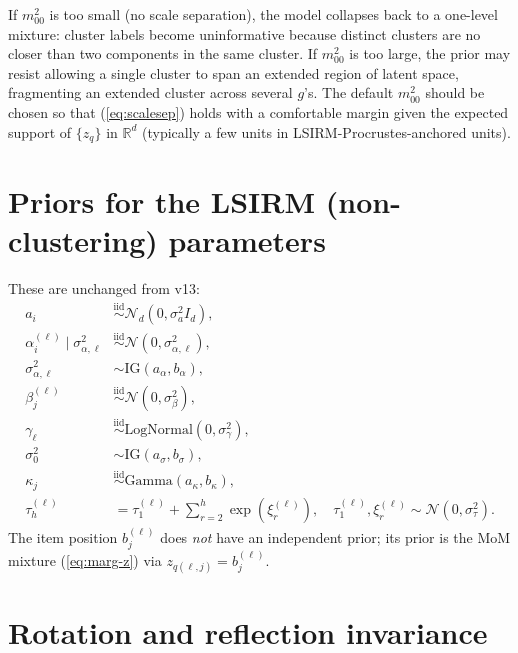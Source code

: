 \documentclass[11pt]{article}
\newcommand{\R}{\mathbb{R}}
\newcommand{\IG}{\mathrm{IG}}
\begin{document}
If $m_{00}^2$ is too small (no scale separation), the model collapses
back to a one-level mixture: cluster labels become uninformative because
distinct clusters are no closer than two components in the same cluster.
If $m_{00}^2$ is too large, the prior may resist allowing a single cluster
to span an extended region of latent space, fragmenting an extended
cluster across several $g$'s. The default $m_{00}^2$ should be chosen so
that (\ref{eq:scalesep}) holds with a comfortable margin given the
expected support of $\{z_q\}$ in $\R^d$ (typically a few units in
LSIRM-Procrustes-anchored units).

\section{Priors for the LSIRM (non-clustering) parameters}
\label{sec:other-priors}

These are unchanged from v13:
\begin{align}
a_i              &\stackrel{\mathrm{iid}}{\sim} \mathcal{N}_d(0,\sigma_a^2 I_d), \label{eq:a-prior}\\
\alpha_i^{(\ell)}\mid \sigma_{\alpha,\ell}^2
                 &\stackrel{\mathrm{iid}}{\sim} \mathcal{N}(0,\sigma_{\alpha,\ell}^2),\label{eq:alpha-prior}\\
\sigma_{\alpha,\ell}^2
                 &\sim \IG(a_\alpha,b_\alpha),\label{eq:sigalpha-prior}\\
\beta_j^{(\ell)} &\stackrel{\mathrm{iid}}{\sim} \mathcal{N}(0,\sigma_\beta^2),\label{eq:beta-prior}\\
\gamma_\ell      &\stackrel{\mathrm{iid}}{\sim} \mathrm{LogNormal}(0,\sigma_\gamma^2),\label{eq:gamma-prior}\\
\sigma_0^2       &\sim \IG(a_\sigma,b_\sigma),\label{eq:sig0-prior}\\
\kappa_j         &\stackrel{\mathrm{iid}}{\sim} \mathrm{Gamma}(a_\kappa,b_\kappa),\label{eq:kappa-prior}\\
\tau_h^{(\ell)}  &= \tau_1^{(\ell)} + \sum_{r=2}^{h}\exp(\xi_r^{(\ell)}),
   \quad \tau_1^{(\ell)},\xi_r^{(\ell)}\sim\mathcal{N}(0,\sigma_\tau^2).\label{eq:tau-prior}
\end{align}
The item position $b_j^{(\ell)}$ does \emph{not} have an independent
prior; its prior is the MoM mixture (\ref{eq:marg-z}) via $z_{q(\ell,j)}=b_j^{(\ell)}$.

\section{Rotation and reflection invariance}
\label{sec:rotation}
\end{document}
